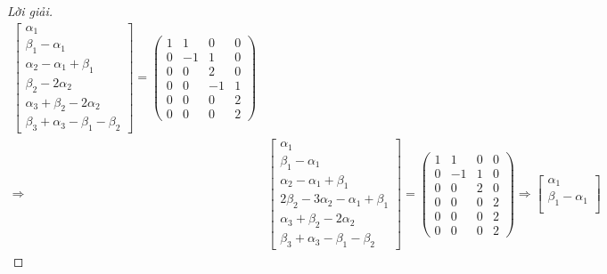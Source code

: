 \documentclass[class=linearalgebra,crop=false]{standalone}
\begin{document}
\begin{proof}[Lời giải]
\begin{align*}
\begin{bmatrix}
            \alpha_{1}                           \\
            \beta_{1} - \alpha_{1}               \\
            \alpha_{2} - \alpha_{1} + \beta_{1}  \\
            \beta_{2} - 2\alpha_{2}              \\
            \alpha_{3} + \beta_{2} - 2\alpha_{2} \\
            \beta_{3} + \alpha_{3} - \beta_{1} - \beta_{2}
        \end{bmatrix}=
        \begin{pmatrix}
            1 & 1  & 0  & 0 \\
            0 & -1 & 1  & 0 \\
            0 & 0  & 2  & 0 \\
            0 & 0  & -1 & 1 \\
            0 & 0  & 0  & 2 \\
            0 & 0  & 0  & 2
        \end{pmatrix}                  \\
        \Longrightarrow &
        \begin{bmatrix}
            \alpha_{1}                                        \\
            \beta_{1} - \alpha_{1}                            \\
            \alpha_{2} - \alpha_{1} + \beta_{1}               \\
            2\beta_{2} - 3\alpha_{2} - \alpha_{1} + \beta_{1} \\
            \alpha_{3} + \beta_{2} - 2\alpha_{2}              \\
            \beta_{3} + \alpha_{3} - \beta_{1} - \beta_{2}
        \end{bmatrix}=
        \begin{pmatrix}
            1 & 1  & 0 & 0 \\
            0 & -1 & 1 & 0 \\
            0 & 0  & 2 & 0 \\
            0 & 0  & 0 & 2 \\
            0 & 0  & 0 & 2 \\
            0 & 0  & 0 & 2
        \end{pmatrix}
        \Longrightarrow
        \begin{bmatrix}
            \alpha_{1}                                                   \\
            \beta_{1} - \alpha_{1}                                       \\

\end{bmatrix}
\end{align*}
\end{proof}
\end{document}
